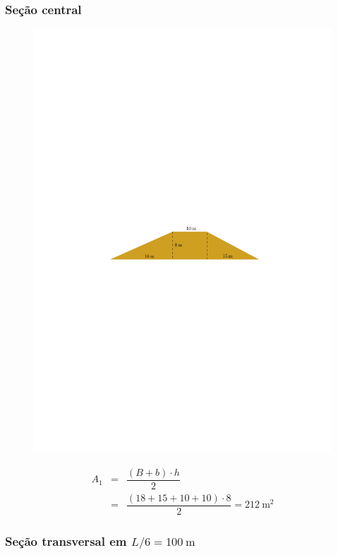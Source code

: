 \documentclass[a4paper, 12pt, brazilian]{article}
\begin{document}
	
	\subsubsection{Seção central}
	
	\begin{figure}[H]
		\centering
		\includegraphics[width=0.85\linewidth]{images/center}
		\label{fig:center}
	\end{figure}
	
	
	\begin{eqnarray}
		A_{1}&=&\dfrac{(B+b)\cdot h}{2}\\
		&=&\dfrac{(18+15+10+10)\cdot 8}{2}
		=\SI{212}{\meter^{2}}
	\end{eqnarray}
	
	
	\subsubsection{Seção transversal em $L/6=\SI{100}{\meter}$}
	
\end{document}

